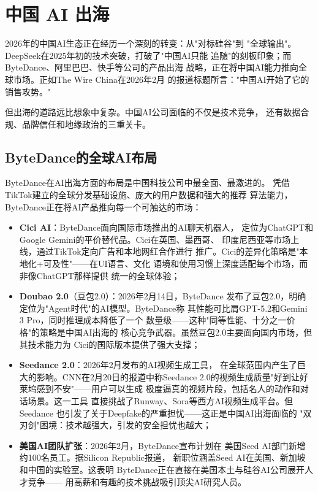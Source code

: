 \section{中国 AI 出海}
\label{sec:outlook-china-global}

2026年的中国AI生态正在经历一个深刻的转变：从"对标硅谷"到
"全球输出"。DeepSeek在2025年初的技术突破，打破了"中国AI只能
追随"的刻板印象；而ByteDance、阿里巴巴、快手等公司的产品出海
战略，正在将中国AI能力推向全球市场。正如The Wire China在2026年2月
的报道标题所言："中国AI开始了它的销售攻势。"

但出海的道路远比想象中复杂。中国AI公司面临的不仅是技术竞争，
还有数据合规、品牌信任和地缘政治的三重关卡。


\subsection{ByteDance的全球AI布局}
\label{subsec:outlook-bytedance-global}

ByteDance在AI出海方面的布局是中国科技公司中最全面、最激进的。
凭借TikTok建立的全球分发基础设施、庞大的用户数据和强大的推荐
算法能力，ByteDance正在将AI产品推向每一个可触达的市场：

\begin{itemize}
  \item \textbf{Cici AI}：ByteDance面向国际市场推出的AI聊天机器人，
    定位为ChatGPT和Google Gemini的平价替代品。Cici在英国、墨西哥、
    印度尼西亚等市场上线，通过TikTok定向广告和本地网红合作进行
    推广。Cici的差异化策略是"本地化+可及性"——在UI语言、文化
    语境和使用习惯上深度适配每个市场，而非像ChatGPT那样提供
    统一的全球体验；

  \item \textbf{Doubao 2.0}（豆包2.0）：2026年2月14日，ByteDance
    发布了豆包2.0，明确定位为"Agent时代"的AI模型。ByteDance称
    其性能可比肩GPT-5.2和Gemini 3 Pro，同时推理成本降低了一个
    数量级——这种"同等性能、十分之一价格"的策略是中国AI出海的
    核心竞争武器。虽然豆包2.0主要面向国内市场，但其技术能力为
    Cici的国际版本提供了强大支撑；

  \item \textbf{Seedance 2.0}：2026年2月发布的AI视频生成工具，
    在全球范围内产生了巨大的影响。CNN在2月20日的报道中称Seedance
    2.0的视频生成质量"好到让好莱坞感到不安"——用户可以生成
    极度逼真的视频片段，包括名人的动作和对话场景。这一工具
    直接挑战了Runway、Sora等西方AI视频生成平台。但Seedance
    也引发了关于Deepfake的严重担忧——这正是中国AI出海面临的
    "双刃剑"困境：技术越强大，引发的安全担忧也越大；

  \item \textbf{美国AI团队扩张}：2026年2月，ByteDance宣布计划在
    美国Seed AI部门新增约100名员工。据Silicon Republic报道，
    新职位涵盖Seed AI在美国、新加坡和中国的实验室。这表明
    ByteDance正在直接在美国本土与硅谷AI公司展开人才竞争——
    用高薪和有趣的技术挑战吸引顶尖AI研究人员。
\end{itemize}


